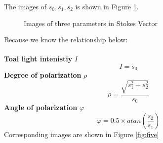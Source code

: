 \documentclass[english]{article}
\begin{document}
The images of $s_{0}, s_{1}, s_{2}$ is shown in Figure \ref{fig:four}.
\begin{figure}[H]
	\centering
	\caption{Images of three parameters in Stokes Vector}
	\label{fig:four}
\end{figure}
Because we know the relationship below:\\
\\
\textbf{Toal light intenistiy} $I$
$$
I = s_{0}
$$
\textbf{Degree of polarization} $\rho$
$$
\rho = \frac{\sqrt{s_{1}^2  + s_{2}^2}}{s_{0}}
$$
\textbf{Angle of polarization} $\varphi$
$$
\varphi = 0.5\times atan(\frac{s_{2}}{s_{1}})
$$
Corresponding images are shown in Figure \ref{fig:five}
\end{document}
